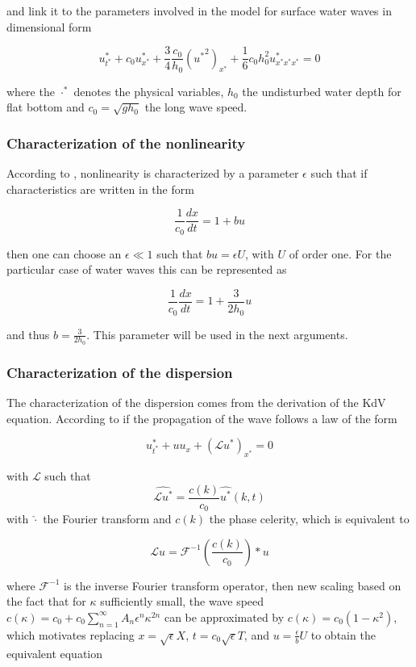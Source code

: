 \noindent and link it to the parameters involved in the model for surface water waves  in dimensional form \cite{Khorsand2014}

\begin{equation}
    u^*_{t^*} + c_0u^*_{x^*} + \frac{3}{4}\frac{c_0}{h_0}({u^*}^2)_{x^*} + \frac{1}{6}c_0h_0^2u^*_{x^*x^*x^*} = 0 
\end{equation}

\noindent where the $\cdot^*$ denotes the physical variables, $h_0$ the undisturbed water depth for flat bottom and $c_0 = \sqrt{gh_0}$  the long wave speed.

\subsubsection{Characterization of the nonlinearity}

\indent According to \cite{BBM1971}, nonlinearity is characterized by a parameter $\epsilon$ such that if characteristics are written in the form

$$ \frac{1}{c_0} \frac{dx}{dt} = 1+ bu$$

\noindent then one can choose an $\epsilon \ll 1$ such that $bu=\epsilon U$, with $U$ of order one. For the particular case of water waves this can be represented as

$$ \frac{1}{c_0} \frac{dx}{dt} = 1 + \frac{3}{2h_0}u$$

\noindent and thus $b = \frac{3}{2h_0}$. This parameter will be used in the next arguments.

\subsubsection{Characterization of the dispersion}

\noindent The characterization of the dispersion comes from the derivation of the KdV equation. According to \cite{BBM1971} if the propagation of the wave follows a law of the form

$$ u^*_{t^*} + uu_x+(\mathcal{L} u^*)_{x^*} = 0$$

\noindent with $\mathcal{L}$ such that $$ \widehat{\mathcal{L}u^*} = \frac{c(k)}{c_0} \widehat{u^*}(k,t)$$ with $\hat \cdot$ the Fourier transform and $c(k)$ the phase celerity, which is equivalent to 

$$ \mathcal{L} u = \mathcal{F}^{-1}\left(\frac{c(k)}{c_0}\right) * u$$ 

\noindent where $\mathcal{F}^{-1}$ is the inverse Fourier transform operator, then new scaling based on the fact that for $\kappa$ sufficiently small, the wave speed $c(\kappa) = c_0 + c_0 \sum_{n=1}^{\infty}A_n\epsilon^n\kappa^{2n}$ can be approximated by $c(\kappa) = c_0(1-\kappa^2)$, which motivates replacing $x=\sqrt{\epsilon} X$, $t =c_0 \sqrt{\epsilon} T$, and $u = \frac{\epsilon}{ b} U$ to obtain the equivalent equation 

